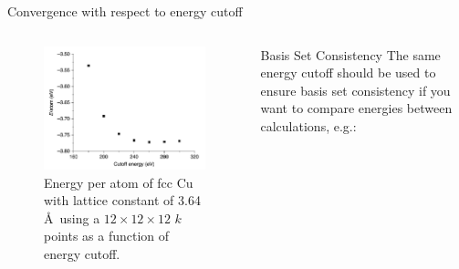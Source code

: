 \documentclass[aspectratio=169]{beamer}
\begin{document}
\begin{frame}{Convergence with respect to energy cutoff}
\begin{columns}
\begin{figure}
    \centering
    \includegraphics[width=0.8\linewidth]{lectures/figures/7_convergence_energy_cutoff.png}
    \caption{Energy per atom of fcc Cu with lattice constant of 3.64 \AA~using a $12 \times 12 \times 12$ $k$ points as a function of energy cutoff.\cite{shollDensityFunctionalTheory2009}}
\end{figure} 
\begin{alertblock}{Basis Set Consistency}
The same energy cutoff should be used to ensure basis set consistency if you want to compare energies between calculations, e.g.:

\end{alertblock}
\end{columns} 

\end{frame} 
\end{document}
